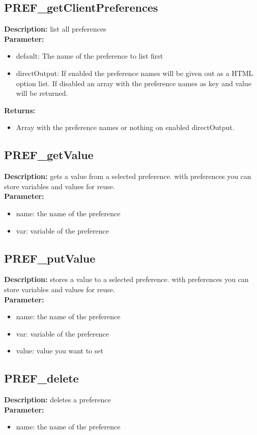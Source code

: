 \subsection{PREF\_getClientPreferences}
\textbf{Description:} list all preferences\\
\textbf{Parameter:}
\begin{itemize}
\item default: The name of the preference to list first
\item directOutput: If enabled the preference names will be given out as a HTML option list. If disabled an array with the preference names as key and value will be returned.
\end{itemize}
\textbf{Returns:}
\begin{itemize}
\item Array with the preference names or nothing on enabled directOutput.
\end{itemize}

\subsection{PREF\_getValue}
\textbf{Description:} gets a value from a selected preference. with preferences you can store variables and values for reuse.\\
\textbf{Parameter:}
\begin{itemize}
\item name: the name of the preference
\item var: variable of the preference
\end{itemize}

\subsection{PREF\_putValue}
\textbf{Description:} stores a value to a selected preference. with preferences you can store variables and values for reuse.\\
\textbf{Parameter:}
\begin{itemize}
\item name: the name of the preference
\item var: variable of the preference
\item value: value you want to set
\end{itemize}

\subsection{PREF\_delete}
\textbf{Description:} deletes a preference\\
\textbf{Parameter:}
\begin{itemize}
\item name: the name of the preference
\end{itemize}

